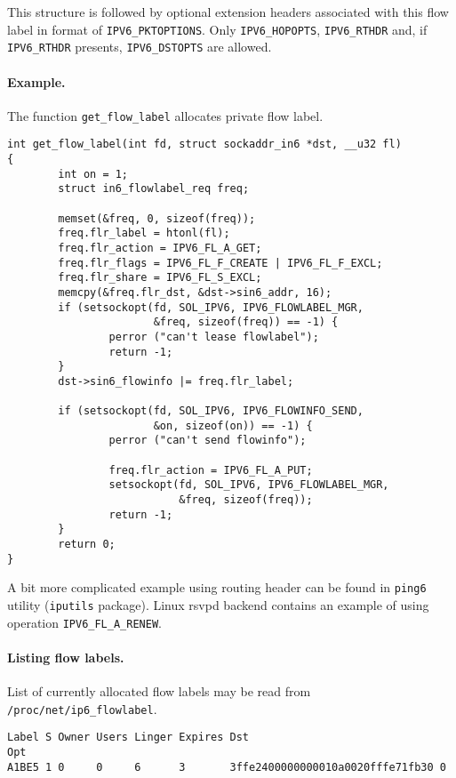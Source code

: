 This structure is followed by optional extension headers associated
with this flow label in format of \verb|IPV6_PKTOPTIONS|. Only
\verb|IPV6_HOPOPTS|, \verb|IPV6_RTHDR| and, if \verb|IPV6_RTHDR| presents,
\verb|IPV6_DSTOPTS| are allowed.

\paragraph{Example.}
 The function \verb|get_flow_label| allocates
private flow label.

\begin{verbatim}
int get_flow_label(int fd, struct sockaddr_in6 *dst, __u32 fl)
{
        int on = 1;
        struct in6_flowlabel_req freq;

        memset(&freq, 0, sizeof(freq));
        freq.flr_label = htonl(fl);
        freq.flr_action = IPV6_FL_A_GET;
        freq.flr_flags = IPV6_FL_F_CREATE | IPV6_FL_F_EXCL;
        freq.flr_share = IPV6_FL_S_EXCL;
        memcpy(&freq.flr_dst, &dst->sin6_addr, 16);
        if (setsockopt(fd, SOL_IPV6, IPV6_FLOWLABEL_MGR,
                       &freq, sizeof(freq)) == -1) {
                perror ("can't lease flowlabel");
                return -1;
        }
        dst->sin6_flowinfo |= freq.flr_label;

        if (setsockopt(fd, SOL_IPV6, IPV6_FLOWINFO_SEND,
                       &on, sizeof(on)) == -1) {
                perror ("can't send flowinfo");

                freq.flr_action = IPV6_FL_A_PUT;
                setsockopt(fd, SOL_IPV6, IPV6_FLOWLABEL_MGR,
                           &freq, sizeof(freq));
                return -1;
        }
        return 0;
}
\end{verbatim}

A bit more complicated example using routing header can be found
in \verb|ping6| utility (\verb|iputils| package). Linux rsvpd backend
contains an example of using operation \verb|IPV6_FL_A_RENEW|.

\paragraph{Listing flow labels.}
List of currently allocated
flow labels may be read from \verb|/proc/net/ip6_flowlabel|.

\begin{verbatim}
Label S Owner Users Linger Expires Dst                              Opt
A1BE5 1 0     0     6      3       3ffe2400000000010a0020fffe71fb30 0
\end{verbatim}

